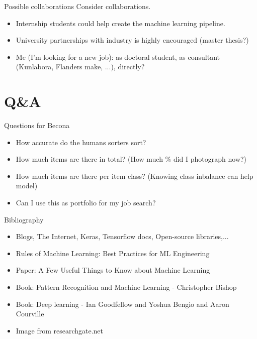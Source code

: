 \documentclass{beamer}
\begin{document}
\begin{frame}{Possible collaborations} 
 Consider collaborations. 
  \begin{itemize}
  \item Internship students could help create the machine learning pipeline.
  \item University partnerships with industry is highly encouraged (master thesis?)
  \item Me (I'm looking for a new job): as doctoral student, as consultant (Kunlabora, Flanders make, ...), directly?
  \end{itemize}
\end{frame}

\section{Q\&A}
\begin{frame}{Questions for Becona}
  \begin{itemize}
    \item How accurate do the humans sorters sort?
    \item How much items are there in total? (How much \% did I photograph now?)
    \item How much items are there per item class? (Knowing class inbalance can help model)
    \item Can I use this as portfolio for my job search? 
  \end{itemize}
\end{frame}


\begin{frame}{Bibliography}
\begin{itemize}
 \item Blogs, The Internet, Keras, Tensorflow docs, Open-source libraries,...
 \item Rules of Machine Learning: Best Practices for ML Engineering 
 \item Paper: A Few Useful Things to Know about Machine Learning
 \item Book: Pattern Recognition and Machine Learning - Christopher Bishop
 \item Book: Deep learning - Ian Goodfellow and Yoshua Bengio and Aaron Courville 
 \item Image from researchgate.net
\end{itemize}

\end{frame}
\end{document}

